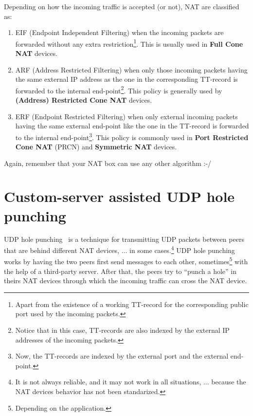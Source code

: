 Depending on how the incoming traffic is accepted (or not), NAT are
classified as:

\begin{enumerate}
\item EIF (Endpoint Independent Filtering) when the incoming packets
  are forwarded without any extra restriction\footnote{Apart from the
    existence of a working TT-record for the corresponding public port
    used by the incoming packets.}. This is usually used in
  \textbf{Full Cone NAT} devices.
\item ARF (Address Restricted Filtering) when only those incoming
  packets having the same external IP address as the one in the
  corresponding TT-record is forwarded to the internal
  end-point\footnote{Notice that in this case, TT-records are also
    indexed by the external IP addresses of the incoming
    packets.}. This policy is generally used by \textbf{(Address)
    Restricted Cone NAT} devices.
\item ERF (Endpoint Restricted Filtering) when only external incoming
  packets having the same external end-point like the one in the
  TT-record is forwarded to the internal end-point\footnote{Now, the
    TT-records are indexed by the external port and the external
    end-point.}. This policy is commonly used in \textbf{Port
    Restricted Cone NAT} (PRCN) and \textbf{Symmetric NAT} devices.
\end{enumerate}

Again, remember that your NAT box can use any other algorithm :-/

\section{Custom-server assisted UDP hole punching}

UDP hole punching~\cite{srisuresh2008state} is a technique for
transmitting UDP packets between peers that are behind different NAT
devices, ... in some cases.\footnote{It is not always reliable, and it
  may not work in all situations, ... because the NAT devices behavior
  has not been standarized.} UDP hole punching works by having the two
peers first send messages to each other, sometimes\footnote{Depending
  on the application.} with the help of a third-party server. After
that, the peers try to ``punch a hole'' in theirs NAT devices through
which the incoming traffic can cross the NAT device.

